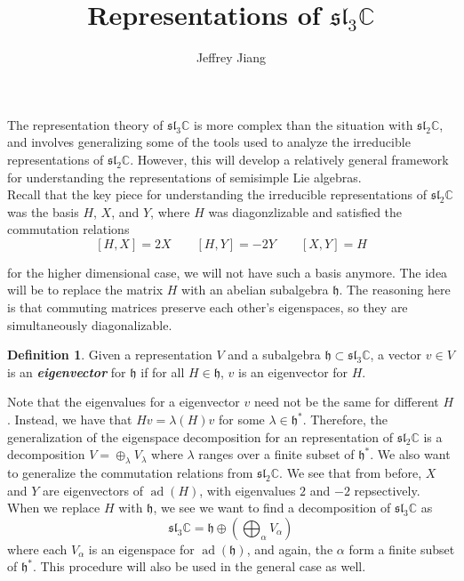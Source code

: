 \documentclass[psamsfonts]{amsart}
\theoremstyle{definition}
\newtheorem{defn}[thm]{Definition}
\theoremstyle{remark}
\renewcommand{\sl}{\mathfrak{sl}}
\newcommand{\ib}[1]{\textbf{\textit{#1}}}
\newcommand{\C}{\mathbb{C}}
\newcommand{\h}{\mathfrak{h}}
\DeclareMathOperator{\ad}{ad}
\begin{document}
%
\author{Jeffrey Jiang}
%
\title{Representations of $\sl_3\C$}
%
\setcounter{section}{1}
%
\maketitle
%
The representation theory of $\sl_3\C$ is more complex than the situation with
$\sl_2\C$, and involves generalizing some of the tools used to analyze the
irreducible representations of $\sl_2\C$. However, this will develop a
relatively general framework for understanding the representations of
semisimple Lie algebras.\\

Recall that the key piece for understanding the irreducible representations of
$\sl_2\C$ was the basis $H$, $X$, and $Y$, where $H$ was diagonzlizable and
satisfied the commutation relations
\[
[H,X] = 2X \qquad [H,Y] = -2Y \qquad [X,Y] = H
\]

for the higher dimensional case, we will not have such a basis anymore. The idea
will be to replace the matrix $H$ with an abelian subalgebra $\h$. The reasoning
here is that commuting matrices preserve each other's eigenspaces, so they
are simultaneously diagonalizable.
%
\begin{defn}
Given a representation $V$ and a subalgebra $\h \subset \sl_3\C$, a vector
$v \in V$ is an \ib{eigenvector} for $\h$ if for all $H \in \h$, $v$ is an
eigenvector for $H$.
\end{defn}
%
Note that the eigenvalues for a eigenvector $v$ need not be the same for different
$H$. Instead, we have that $Hv = \lambda(H)v$ for some $\lambda \in \h^*$.
Therefore, the generalization of the eigenspace decomposition for an representation
of $\sl_2\C$ is a decomposition $V = \oplus_\lambda V_\lambda$ where $\lambda$
ranges over a finite subset of $\h^*$. We also want to generalize the commutation
relations from $\sl_2\C$. We see that from before, $X$ and $Y$ are eigenvectors
of $\ad(H)$, with eigenvalues $2$ and $-2$ repsectively. When we replace $H$ with
$\h$, we see we want to find a decomposition of $\sl_3\C$ as
\[
\sl_3\C = \h \oplus(\bigoplus_\alpha V_\alpha)
\]
where each $V_\alpha$ is an eigenspace for $\ad(\h)$, and again, the $\alpha$ form
a finite subset of $\h^*$. This procedure will also be used in the general case
as well. \\
\end{document}
